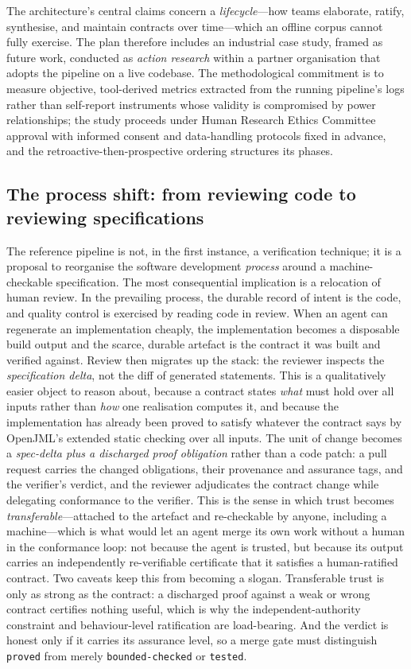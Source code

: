 The architecture's central claims concern a \emph{lifecycle}---how teams elaborate, ratify, synthesise, and maintain contracts over time---which an offline corpus cannot fully exercise. The plan therefore includes an industrial case study, framed as future work, conducted as \emph{action research} within a partner organisation that adopts the pipeline on a live codebase. The methodological commitment is to measure objective, tool-derived metrics extracted from the running pipeline's logs rather than self-report instruments whose validity is compromised by power relationships; the study proceeds under Human Research Ethics Committee approval with informed consent and data-handling protocols fixed in advance, and the retroactive-then-prospective ordering structures its phases.

\subsection{The process shift: from reviewing code to reviewing specifications}\label{subsec:a5-processshift}

The reference pipeline is not, in the first instance, a verification technique; it is a proposal to reorganise the software development \emph{process} around a machine-checkable specification. The most consequential implication is a relocation of human review. In the prevailing process, the durable record of intent is the code, and quality control is exercised by reading code in review. When an agent can regenerate an implementation cheaply, the implementation becomes a disposable build output and the scarce, durable artefact is the contract it was built and verified against. Review then migrates up the stack: the reviewer inspects the \emph{specification delta}, not the diff of generated statements. This is a qualitatively easier object to reason about, because a contract states \emph{what} must hold over all inputs rather than \emph{how} one realisation computes it, and because the implementation has already been proved to satisfy whatever the contract says by OpenJML's extended static checking over all inputs. The unit of change becomes a \emph{spec-delta plus a discharged proof obligation} rather than a code patch: a pull request carries the changed obligations, their provenance and assurance tags, and the verifier's verdict, and the reviewer adjudicates the contract change while delegating conformance to the verifier. This is the sense in which trust becomes \emph{transferable}---attached to the artefact and re-checkable by anyone, including a machine---which is what would let an agent merge its own work without a human in the conformance loop: not because the agent is trusted, but because its output carries an independently re-verifiable certificate that it satisfies a human-ratified contract. Two caveats keep this from becoming a slogan. Transferable trust is only as strong as the contract: a discharged proof against a weak or wrong contract certifies nothing useful, which is why the independent-authority constraint and behaviour-level ratification are load-bearing. And the verdict is honest only if it carries its assurance level, so a merge gate must distinguish \texttt{proved} from merely \texttt{bounded-checked} or \texttt{tested}.


